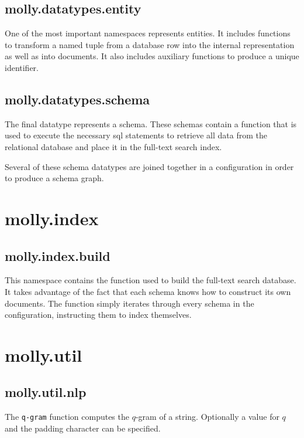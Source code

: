 		
		\clearpage
		\subsection{molly.datatypes.entity}
			One of the most important namespaces represents entities.  It includes functions to transform a named tuple from a database row into the internal representation as well as into documents.  It also includes auxiliary functions to produce a unique identifier.
			
		
		\clearpage
		\subsection{molly.datatypes.schema}
			The final datatype represents a schema.  These schemas contain a function that is used to execute the necessary \gls{sql} statements to retrieve all data from the relational database and place it in the full-text search index.
			
			Several of these schema datatypes are joined together in a configuration in order to produce a schema graph.
			
	
	\clearpage
	\section{molly.index}
		\subsection{molly.index.build}
			This namespace contains the function used to build the full-text search database.  It takes advantage of the fact that each schema knows how to construct its own documents.  The function simply iterates through every schema in the configuration, instructing them to index themselves.
			
	
	\clearpage
	\section{molly.util}
		\subsection{molly.util.nlp}
			The \texttt{q-gram} function computes the \(q\)-gram of a string.  Optionally a value for \(q\) and the padding character can be specified.
			
